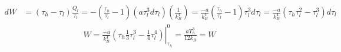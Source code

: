 \[
\begin{aligned}
  dW & = (\tau_h - \tau_l ) \frac{ Q_l}{\tau_l } = - \left( \frac{\tau_h}{\tau_l } - 1 \right) (a\tau_l^3 d\tau_l ) \left( \frac{1}{k_B^4} \right) = \frac{ -a}{k_B^4} \left( \frac{ \tau_h }{\tau_l } - 1 \right) \tau_l^3 d\tau_l = \frac{-a}{k_B^4} ( \tau_h \tau_l^2 - \tau_l^3 ) d\tau_l 
\end{aligned}
\]
\[
\begin{aligned}
  W = \left. \frac{-a}{k_B^4} \left( \tau_h \frac{1}{3} \tau_l^3 - \frac{1}{4} \tau_l^4 \right) \right|_{\tau_h}^0 = \boxed{ \frac{a T_h^3}{ 12 k_B } =W }
\end{aligned}
\]
















